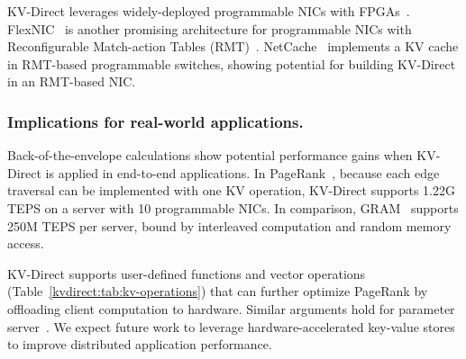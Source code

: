 KV-Direct leverages widely-deployed programmable NICs with FPGAs~\cite{putnam2014reconfigurable,caulfield2016cloud}. FlexNIC~\cite{kaufmann2015flexnic,kaufmann2016krishnamurthy} is another promising architecture for programmable NICs with Reconfigurable Match-action Tables (RMT)~\cite{bosshart2013forwarding}.
NetCache~\cite{netcache-sosp17} implements a KV cache in RMT-based programmable switches, showing potential for building KV-Direct in an RMT-based NIC.

\subsubsection{Implications for real-world applications.}

Back-of-the-envelope calculations show potential performance gains when KV-Direct is applied in end-to-end applications. In PageRank~\cite{page1999pagerank}, because each edge traversal can be implemented with one KV operation, KV-Direct supports 1.22G TEPS on a server with 10 programmable NICs. In comparison, GRAM~\cite{wu2015g} supports 250M TEPS per server, bound by interleaved computation and random memory access.

KV-Direct supports user-defined functions and vector operations (Table~\ref{kvdirect:tab:kv-operations}) that can further optimize PageRank by offloading client computation to hardware. Similar arguments hold for parameter server~\cite{li2014scaling}. We expect future work to leverage hardware-accelerated key-value stores to improve distributed application performance.
